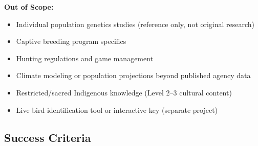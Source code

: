 \documentclass[11pt,letterpaper]{article}
\begin{document}
\textbf{Out of Scope:}
\begin{itemize}[leftmargin=2em]
\item Individual population genetics studies (reference only, not original research)
\item Captive breeding program specifics
\item Hunting regulations and game management
\item Climate modeling or population projections beyond published agency data
\item Restricted/sacred Indigenous knowledge (Level 2--3 cultural content)
\item Live bird identification tool or interactive key (separate project)
\end{itemize}

\subsection{Success Criteria}
\end{document}
